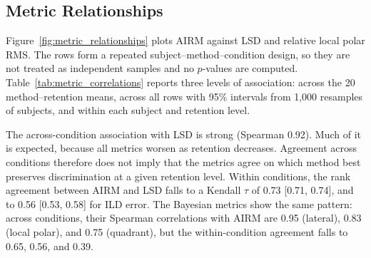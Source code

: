 \documentclass[journal]{IEEEtran}
\begin{document}
\subsection{Metric Relationships}
Figure~\ref{fig:metric_relationships} plots AIRM against LSD and relative local polar RMS. The rows form a repeated subject--method--condition design, so they are not treated as independent samples and no \(p\)-values are computed. Table~\ref{tab:metric_correlations} reports three levels of association: across the 20 method--retention means, across all rows with 95\% intervals from 1,000 resamples of subjects, and within each subject and retention level.

The across-condition association with LSD is strong (Spearman 0.92). Much of it is expected, because all metrics worsen as retention decreases. Agreement across conditions therefore does not imply that the metrics agree on which method best preserves discrimination at a given retention level. Within conditions, the rank agreement between AIRM and LSD falls to a Kendall \(\tau\) of 0.73 [0.71, 0.74], and to 0.56 [0.53, 0.58] for ILD error. The Bayesian metrics show the same pattern: across conditions, their Spearman correlations with AIRM are 0.95 (lateral), 0.83 (local polar), and 0.75 (quadrant), but the within-condition agreement falls to 0.65, 0.56, and 0.39.
\end{document}
